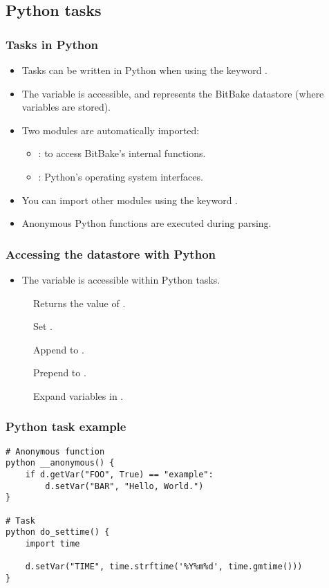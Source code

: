 \subsection{Python tasks}

\begin{frame}
  \frametitle{Tasks in Python}
  \begin{itemize}
    \item Tasks can be written in Python when using the keyword
      .
    \item The  variable is accessible, and represents the
      BitBake datastore (where variables are stored).
    \item Two modules are automatically imported:
      \begin{itemize}
        \item {}: to access BitBake's internal functions.
        \item {}: Python's operating system interfaces.
      \end{itemize}
    \item You can import other modules using the keyword
      .
    \item Anonymous Python functions are executed during parsing.
  \end{itemize}
\end{frame}

\begin{frame}
  \frametitle{Accessing the datastore with Python}
  \begin{itemize}
    \item The  variable is accessible within Python tasks.
  \end{itemize}
  \begin{description}
    \item[] Returns the value of
      .
    \item[] Set .
    \item[] Append  to
      .
    \item[] Prepend  to
      .
    \item[] Expand variables in
      .
  \end{description}
\end{frame}

\begin{frame}[fragile]
  \frametitle{Python task example}
  \begin{verbatim}
# Anonymous function
python __anonymous() {
    if d.getVar("FOO", True) == "example":
        d.setVar("BAR", "Hello, World.")
}

# Task
python do_settime() {
    import time

    d.setVar("TIME", time.strftime('%Y%m%d', time.gmtime()))
}
  \end{verbatim}
\end{frame}

